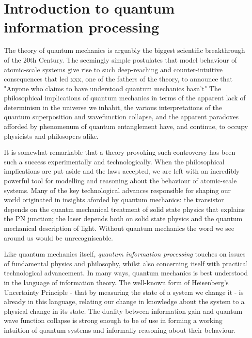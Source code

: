 \chapter{Introduction to quantum information processing} 
\label{ch:Introduction}

The theory of quantum mechanics is arguably the biggest scientific breakthrough of the 20th Century. The seemingly simple postulates that model behaviour of atomic-scale systems give rise to such deep-reaching and counter-intuitive consequences that led  xxx, one of the fathers of the theory, to announce that
"Anyone who claims to have understood quantum mechanics hasn't"
The philosophical implications of quantum mechanics in terms of the apparent lack of determinism in the universe we inhabit, the various interpretations of the quantum superposition and wavefunction collapse, and the apparent paradoxes afforded by phenomenum of quantum entanglement have, and continue, to occupy physicists and philosopers alike.

It is somewhat remarkable that a theory provoking such controversy has been such a success experimentally and technologically. When the philosophical implications are put aside and the laws accepted, we are left with an incredibly powerful tool for modelling and reasoning about the behaviour of atomic-scale systems. Many of the key technological advances responsible for shaping our world originated in insights aforded by quantum mechanics: the transistor depends on the quantm mechanical treatment of solid state physics that explains the PN junction; the laser depends both on solid state physics and the quantum mechanical description of light. Without quantum mechanics the word we see around us would be unrecogniseable.

Like quantum mechanics itself, \textit{quantum information processing} touches on issues of fundamental physics and philosophy, whilst also concerning itself with practical technological advancement. In many ways, quantum mechanics is best understood in the language of information theory. The well-known form of Heisenberg's Uncertainty Principle - that by measuring the state of a system we change it - is already in this language, relating our change in knowledge about the system to a physical change in its state. The duality between information gain and quantum wave function collapse is strong enough to be of use in forming a working intuition of quantum systems and informally reasoning about their behaviour.



